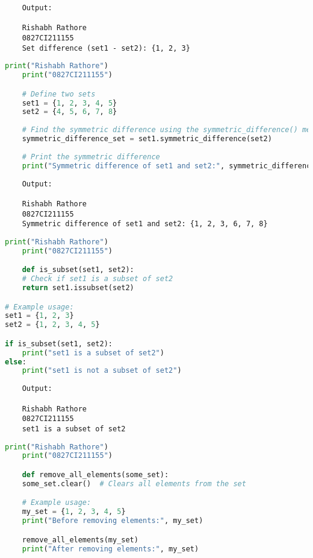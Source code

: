 \documentclass{report}
\begin{document}
\begin{verbatim}
	Output:

	Rishabh Rathore
	0827CI211155
	Set difference (set1 - set2): {1, 2, 3}

\end{verbatim}


\newpage


\sol 
\begin{lstlisting}[language=Python]
	print("Rishabh Rathore")
	print("0827CI211155")

	# Define two sets
	set1 = {1, 2, 3, 4, 5}
	set2 = {4, 5, 6, 7, 8}
	
	# Find the symmetric difference using the symmetric_difference() method
	symmetric_difference_set = set1.symmetric_difference(set2)
	
	# Print the symmetric difference
	print("Symmetric difference of set1 and set2:", symmetric_difference_set)
\end{lstlisting}

\begin{verbatim}
	Output:

	Rishabh Rathore
	0827CI211155
	Symmetric difference of set1 and set2: {1, 2, 3, 6, 7, 8}
\end{verbatim}


\newpage


\sol 
\begin{lstlisting}[language=Python]
	print("Rishabh Rathore")
	print("0827CI211155")

	def is_subset(set1, set2):
    # Check if set1 is a subset of set2
    return set1.issubset(set2)

# Example usage:
set1 = {1, 2, 3}
set2 = {1, 2, 3, 4, 5}

if is_subset(set1, set2):
    print("set1 is a subset of set2")
else:
    print("set1 is not a subset of set2")
\end{lstlisting}

\begin{verbatim}
	Output:

	Rishabh Rathore
	0827CI211155
	set1 is a subset of set2

\end{verbatim}


\newpage


\sol 
\begin{lstlisting}[language=Python]
	print("Rishabh Rathore")
	print("0827CI211155")

	def remove_all_elements(some_set):
    some_set.clear()  # Clears all elements from the set

	# Example usage:
	my_set = {1, 2, 3, 4, 5}
	print("Before removing elements:", my_set)

	remove_all_elements(my_set)
	print("After removing elements:", my_set)
\end{lstlisting}
\end{document}
